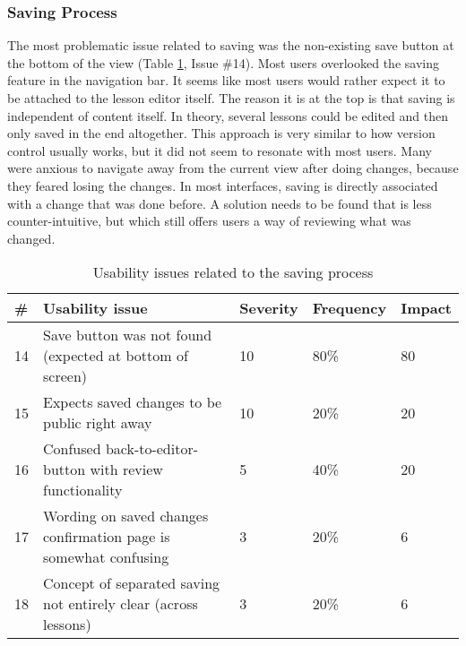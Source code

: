 \subsubsection{Saving Process}
The most problematic issue related to saving was the non-existing save button at the bottom of the view (Table \ref{table:issues-saving-process}, Issue \#14). Most users overlooked the saving feature in the navigation bar. It seems like most users would rather expect it to be attached to the lesson editor itself. The reason it is at the top is that saving is independent of content itself. In theory, several lessons could be edited and then only saved in the end altogether. This approach is very similar to how version control usually works, but it did not seem to resonate with most users. Many were anxious to navigate away from the current view after doing changes, because they feared losing the changes. In most interfaces, saving is directly associated with a change that was done before. A solution needs to be found that is less counter-intuitive, but which still offers users a way of reviewing what was changed.

\begin{table}[h!]
\centering
\begin{tabular}{|l|p{7cm}|l|l|l|}
\hline
\rowcolor[HTML]{EFEFEF}
\textbf{\#} & \textbf{Usability issue} & \textbf{Severity} & \textbf{Frequency} & \textbf{Impact} \\ \hline
14 & Save button was not found (expected at bottom of screen) & 10 & 80\% & 80 \\ \hline
15 & Expects saved changes to be public right away & 10 & 20\% & 20 \\ \hline
16 & Confused back-to-editor-button with review functionality & 5 & 40\% & 20 \\ \hline
17 & Wording on saved changes confirmation page is somewhat confusing & 3 & 20\% & 6 \\ \hline
18 & Concept of separated saving not entirely clear (across lessons) & 3 & 20\% & 6 \\ \hline
\end{tabular}
\caption{Usability issues related to the saving process}
\label{table:issues-saving-process}
\end{table}


